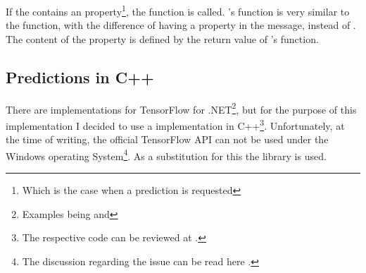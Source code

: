 If the  contains an  property\footnote{Which is the case when a prediction is requested}, the  function is called.
's  function is very similar to the  function, with the difference of having a  property in the message, instead of .
The content of the  property is defined by the return value of 's  function.

\subsection{Predictions in C++}

There are implementations for TensorFlow for .NET\footnote{Examples being  and  },
but for the purpose of this implementation I decided to use a implementation in C++\footnote{The respective code can be reviewed at .}.
Unfortunately, at the time of writing, the official TensorFlow API can not be used under the Windows operating System\footnote{The discussion regarding the issue can be read here .}.
As a substitution for this the  library is used. %

